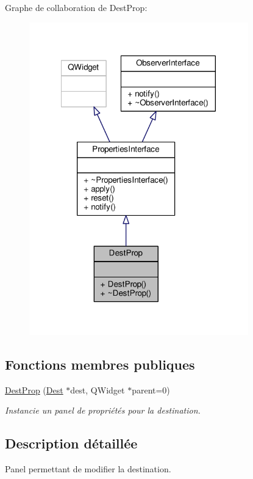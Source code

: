 Graphe de collaboration de Dest\+Prop\+:
\nopagebreak
\begin{figure}[H]
\begin{center}
\leavevmode
\includegraphics[width=269pt]{d4/d2b/classDestProp__coll__graph}
\end{center}
\end{figure}
\subsection*{Fonctions membres publiques}
\begin{DoxyCompactItemize}
\item 
\hyperlink{classDestProp_accf41a3f4a376030696fca6daff74cff}{Dest\+Prop} (\hyperlink{classDest}{Dest} $\ast$dest, Q\+Widget $\ast$parent=0)
\begin{DoxyCompactList}\small\item\em Instancie un panel de propriétés pour la destination. \end{DoxyCompactList}\end{DoxyCompactItemize}


\subsection{Description détaillée}
Panel permettant de modifier la destination. 

